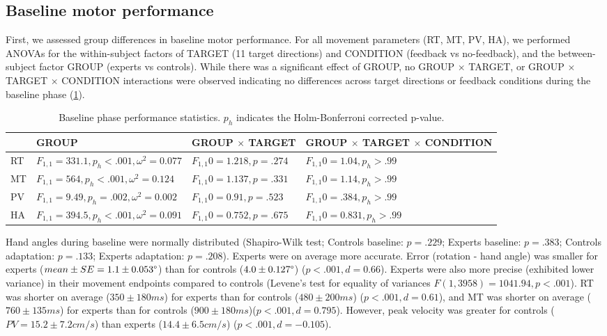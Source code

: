 \documentclass[man, 11pt, longtable, floatsintext, notab]{apa6}
\begin{document}
\subsection{Baseline motor performance}
First, we assessed group differences in baseline motor
performance. For all movement parameters (RT, MT, PV, HA),
we performed ANOVAs for the within-subject factors of TARGET
(11 target directions) and CONDITION (feedback vs
no-feedback), and the between-subject factor GROUP (experts
vs controls). While there was a significant effect of GROUP,
no GROUP $\times$ TARGET, or GROUP $\times$ TARGET $\times$
CONDITION interactions were observed indicating no
differences across target directions or feedback conditions
during the baseline phase (\ref{table_1}).
\begin{table}[t]
  \centering
  \footnotesize
  \begin{tabular}{ l|l|l|l } 
    & GROUP & GROUP $\times$ TARGET & GROUP $\times$ TARGET $\times$ CONDITION \\
    \hline
    RT & $F_{1,1}=331.1,  p_{h} <.001, \omega^2 = 0.077$ & $F_{1,1}0=1.218, p=.274$ & $F_{1,1}0=1.04, p_{h}>.99$\\ 
    MT & $F_{1,1} = 564, p_{h} <.001, \omega^2 = 0.124$ & $F_{1,1}0=1.137, p=.331$ & $F_{1,1}0=1.14, p_{h} >.99$\\  
    PV & $F_{1,1} = 9.49, p_{h} =.002, \omega^2 = 0.002$ & $F_{1,1}0=0.91, p=.523$ & $F_{1,1}0=.384, p_{h} >.99$\\ 
    HA & $F_{1,1}=394.5, p_{h} <.001, \omega^2 = 0.091$ & $F_{1,1}0=0.752, p=.675$ & $F_{1,1}0=0.831, p_{h} >.99$\\
  \end{tabular}
  \caption{Baseline phase performance statistics. $p_{h}$ indicates 
  the Holm-Bonferroni corrected p-value.}
  \label{table_1}
\end{table}

Hand angles during baseline were normally distributed
(Shapiro-Wilk test; Controls baseline: $p=.229$; Experts
baseline: $p=.383$; Controls adaptation: $p=.133$; Experts
adaptation: $p=.208$). Experts were on average more
accurate. Error (rotation - hand angle) was smaller for
experts ($mean \pm SE = 1.1 \pm 0.053\degree$) than for
controls ($4.0\pm0.127\degree$) ($p<.001, d = 0.66$).
Experts were also more precise (exhibited lower variance) in
their movement endpoints compared to controls (Levene's test
for equality of variances $F(1, 3958) = 1041.94, p < .001$).
RT was shorter on average ($350 \pm 180ms$) for experts than
for controls ($480 \pm 200ms$) ($p<.001, d = 0.61$), and MT
was shorter on average ($760 \pm 135ms$) for experts than
for controls ($900 \pm 180ms$)($p<.001, d= 0.795$). However,
peak velocity was greater for controls ($PV = 15.2\pm7.2
cm/s$) than experts ($14.4\pm6.5 cm/s$) ($p<.001, d =-
0.105$).
\end{document}

